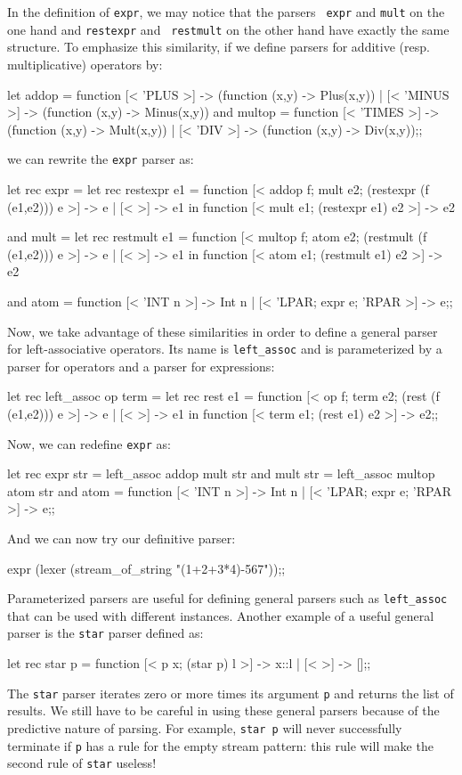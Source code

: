 In the definition of {\tt expr}, we may notice that the parsers {\tt
expr} and {\tt mult} on the one hand and {\tt restexpr} and {\tt
restmult} on the other hand have exactly the same structure. To
emphasize this similarity, if we define parsers for additive (resp.
multiplicative) operators by:
\begin{caml_example}
let addop = function
  [< 'PLUS >] -> (function (x,y) -> Plus(x,y))
| [< 'MINUS >] -> (function (x,y) -> Minus(x,y))
and multop = function
  [< 'TIMES >] -> (function (x,y) -> Mult(x,y))
| [< 'DIV >] -> (function (x,y) -> Div(x,y));;
\end{caml_example}
we can rewrite the {\tt expr} parser as:
\begin{caml_example}
let rec expr =
    let rec restexpr e1 = function
        [< addop f; mult e2; (restexpr (f (e1,e2))) e >] -> e
      | [< >] -> e1
in function [< mult e1; (restexpr e1) e2 >] -> e2

and mult =
    let rec restmult e1 = function
        [< multop f; atom e2; (restmult (f (e1,e2))) e >] -> e
      | [< >] -> e1
in function [< atom e1; (restmult e1) e2 >] -> e2

and atom = function
  [< 'INT n >] -> Int n
| [< 'LPAR; expr e; 'RPAR >] -> e;;
\end{caml_example}
Now, we take advantage of these similarities in order to define a
general parser for left-associative operators. Its name is
\verb|left_assoc| and is parameterized by a parser for operators and a
parser for expressions:
\begin{caml_example}
let rec left_assoc op term =
    let rec rest e1 = function
        [< op f; term e2; (rest (f (e1,e2))) e >] -> e
      | [< >] -> e1
    in function [< term e1; (rest e1) e2 >] -> e2;;
\end{caml_example}
Now, we can redefine {\tt expr} as:
\begin{caml_example}
let rec expr str = left_assoc addop mult str
and mult str = left_assoc multop atom str
and atom = function
  [< 'INT n >] -> Int n
| [< 'LPAR; expr e; 'RPAR >] -> e;;
\end{caml_example}
And we can now try our definitive parser:
\begin{caml_example}
expr (lexer (stream_of_string "(1+2+3*4)-567"));;
\end{caml_example}
Parameterized parsers are useful for defining general parsers such as
\verb|left_assoc| that can
be used with different instances. Another example of a useful general
parser is the {\tt star} parser defined as:
\begin{caml_example}
let rec star p = function
  [< p x; (star p) l >] -> x::l
| [< >] -> [];;
\end{caml_example}
The {\tt star} parser iterates zero or more times its argument {\tt p}
and returns the list of results. We still have to be careful in using
these general parsers because of the predictive nature of parsing. For
example, {\tt star p} will never successfully terminate if {\tt p}
has a rule for the empty stream pattern: this rule will make
the second rule of {\tt star} useless!

